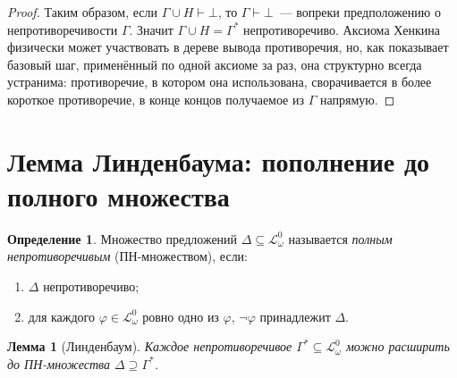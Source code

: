 \documentclass[12pt, a4paper]{article}
\theoremstyle{plain}
\newtheorem{lemma}[theorem]{Лемма}
\theoremstyle{definition}
\newtheorem{definition}[theorem]{Определение}
\newcommand{\proves}{\vdash}
\newcommand{\Lw}{\mathcal{L}_\omega}
\begin{document}
\begin{proof}
\smallskip
Таким образом, если $\Gamma \cup H \proves \bot$, то $\Gamma \proves \bot$~---
вопреки предположению о непротиворечивости $\Gamma$. Значит
$\Gamma \cup H = \Gamma^*$ непротиворечиво. Аксиома Хенкина физически
может участвовать в дереве вывода противоречия, но, как показывает
базовый шаг, применённый по одной аксиоме за раз, она структурно
всегда устранима: противоречие, в котором она использована,
сворачивается в более короткое противоречие, в конце концов получаемое
из $\Gamma$ напрямую.
\end{proof}

\section{Лемма Линденбаума: пополнение до полного множества}

\begin{definition}
Множество предложений $\Delta \subseteq \Lw^0$ называется
\emph{полным непротиворечивым} (ПН-множеством), если:
\begin{enumerate}[label=(\roman*)]
  \item $\Delta$ непротиворечиво;
  \item для каждого $\varphi \in \Lw^0$ ровно одно из $\varphi,\,\neg\varphi$
        принадлежит $\Delta$.
\end{enumerate}
\end{definition}

\begin{lemma}[Линденбаум]\label{lem:lindenbaum}
Каждое непротиворечивое $\Gamma^* \subseteq \Lw^0$ можно расширить
до ПН-множества $\Delta \supseteq \Gamma^*$.
\end{lemma}
\end{document}

